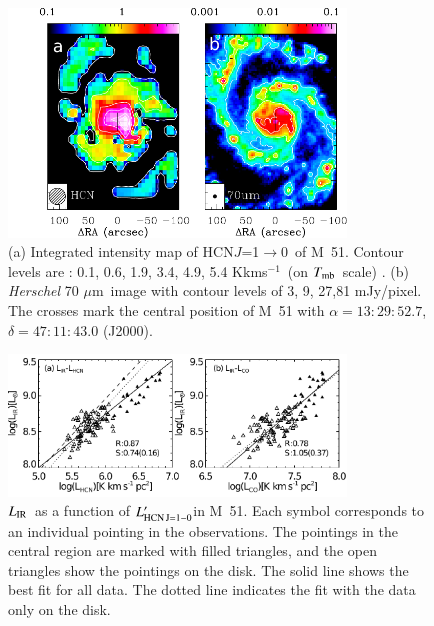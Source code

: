 \documentclass[legal,11pt]{article}
\def\kms    {\ifmmode{{\rm \ts km\ts s}^{-1}}\else{\ts km\ts s$^{-1}$}\fi}
\def\kms    {km\,s$^{-1}$\,}
\def\Kkms{K\,\kms }
\def\,{\thinspace}
\def\mum{$\mu$m}
\def\Tmb {$T_{\rm mb}$}
\def\LIR     {$L_{\rm IR}$}
\def\LHCNoz  {$L'_{\rm HCN\, J=1-0}$}
\def\HCNoz      {HCN\,$J$=1$\rightarrow$0}
\begin{document}
\begin{figure}
\centering
\includegraphics[width=0.8\textwidth]{M51_IR_HCN.pdf}
\caption{ (a) Integrated intensity map of \HCNoz\ of M~51. Contour levels are :
        0.1, 0.6, 1.9, 3.4, 4.9, 5.4  \Kkms\ (on \Tmb\ scale) . (b) {\it Herschel} 70
        \mum\ image with contour levels of 3, 9, 27,81 mJy/pixel.  The crosses
        mark the central position of M~51 with $\alpha= 13:29:52.7$, $\delta=
        47:11:43.0$ (J2000).} \label{fig:M51_IR_HCN}
\end{figure}


\begin{figure}
\centering
\includegraphics[width=0.8\textwidth]{M51.pdf}
\caption{
       \LIR\ as a function of \LHCNoz in M~51.  Each symbol corresponds to an
       individual pointing in the observations.  The pointings in the central
       region are marked with filled triangles, and the open triangles show the
       pointings on the disk.  The solid line shows the best fit for all data.
       The dotted line indicates the fit with the data only on the disk.} \label{fig:M51}
\end{figure}
\end{document}
